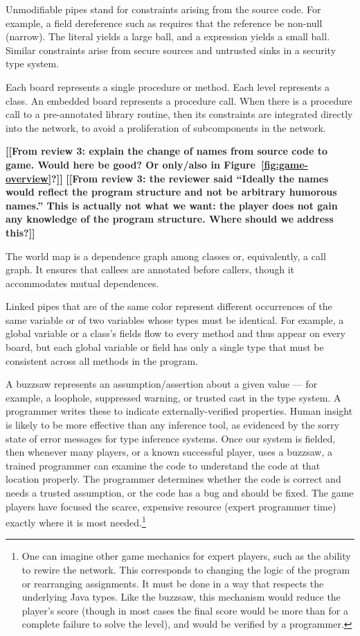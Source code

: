 \documentclass{sig-alternate}
\newcommand{\figref}[1]{Figure~\ref{#1}}
\def\<#1>{\codeid{#1}}
\newcommand{\codeid}[1]{\ifmmode{\mbox{\ttfamily{#1}}}\else{\ttfamily #1}\fi}
\newcommand{\todo}[1]{{\color{red}\bfseries [[#1]]}}
\begin{document}
Unmodifiable pipes stand for constraints arising from the source code.
For example, a field dereference such as \<x.f> requires that the
reference \<x> be non-null (narrow).  The literal \<null> yields a
large ball, and a \<new> expression yields a small ball.  Similar
constraints arise from secure sources and untrusted sinks in a
security type system.

Each board represents a single procedure or method.  Each level
represents a class.  An embedded board represents a procedure call.
When there is a procedure call to a pre-annotated library routine,
then its constraints are integrated directly into the network, to
avoid a proliferation of subcomponents in the network.

\todo{From review 3: explain the change of names from source code to
  game. Would here be good? Or only/also in \figref{fig:game-overview}?}
\todo{From review 3: the reviewer said ``Ideally the names would
  reflect the program structure and not be arbitrary humorous names.''
  This is actually not what we want: the player does not gain any
  knowledge of the program structure. Where should we address this?}

The world map is a dependence graph among classes or, equivalently, a
call graph.  It ensures that callees are annotated before callers,
though it accommodates mutual dependences.

Linked pipes that are of the same color represent different
occurrences of the same variable or of two variables whose types must
be identical.  For example, a global variable or a class's fields flow
to every method and thus appear on every board, but each global
variable or field has only a single type that must be consistent
across all methods in the program.

A buzzsaw represents an assumption/assertion about a given value --- for
example, a loophole, suppressed warning, or trusted cast in the type
system.  A programmer writes these to indicate externally-verified
properties.  Human insight is likely to be
more effective than any inference tool, as evidenced by the sorry
state of error messages for type inference systems.  Once our system is
fielded, then whenever many
players, or a known successful player, uses a buzzsaw, a trained
programmer can examine the code to understand the code at that
location properly.  The programmer determines whether the code is
correct and needs a trusted assumption, or the code has a bug and
should be fixed.  The game players have focused the scarce, expensive
resource (expert programmer time) exactly where it is most
needed.\footnote{One can imagine other game mechanics for expert
  players, such as the ability to rewire the network.  This
  corresponds to changing the logic of the program or rearranging
  assignments.  It must be done in a way that respects the underlying
  Java types.  Like the buzzsaw, this mechanism would reduce the
  player's score (though in most cases the final score would be more
  than for a complete failure to solve the level), and would be
  verified by a programmer.}
\end{document}
